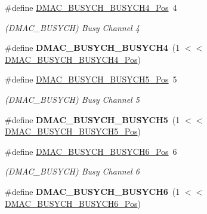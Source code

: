 \begin{DoxyCompactItemize}
\item 
\hypertarget{group___s_a_m_l21___d_m_a_c_ga21683f6b8e7523f9b7234438cac5e01f}{}\#define \hyperlink{group___s_a_m_l21___d_m_a_c_ga21683f6b8e7523f9b7234438cac5e01f}{D\+M\+A\+C\+\_\+\+B\+U\+S\+Y\+C\+H\+\_\+\+B\+U\+S\+Y\+C\+H4\+\_\+\+Pos}~4\label{group___s_a_m_l21___d_m_a_c_ga21683f6b8e7523f9b7234438cac5e01f}

\begin{DoxyCompactList}\small\item\em (D\+M\+A\+C\+\_\+\+B\+U\+S\+Y\+C\+H) Busy Channel 4 \end{DoxyCompactList}\item 
\hypertarget{group___s_a_m_l21___d_m_a_c_ga07547f972d8d68d60fc09ed0f28b826b}{}\#define {\bfseries D\+M\+A\+C\+\_\+\+B\+U\+S\+Y\+C\+H\+\_\+\+B\+U\+S\+Y\+C\+H4}~(1 $<$$<$ \hyperlink{group___s_a_m_l21___d_m_a_c_ga21683f6b8e7523f9b7234438cac5e01f}{D\+M\+A\+C\+\_\+\+B\+U\+S\+Y\+C\+H\+\_\+\+B\+U\+S\+Y\+C\+H4\+\_\+\+Pos})\label{group___s_a_m_l21___d_m_a_c_ga07547f972d8d68d60fc09ed0f28b826b}

\item 
\hypertarget{group___s_a_m_l21___d_m_a_c_ga1a406090b79f6b060ac17400735d2f13}{}\#define \hyperlink{group___s_a_m_l21___d_m_a_c_ga1a406090b79f6b060ac17400735d2f13}{D\+M\+A\+C\+\_\+\+B\+U\+S\+Y\+C\+H\+\_\+\+B\+U\+S\+Y\+C\+H5\+\_\+\+Pos}~5\label{group___s_a_m_l21___d_m_a_c_ga1a406090b79f6b060ac17400735d2f13}

\begin{DoxyCompactList}\small\item\em (D\+M\+A\+C\+\_\+\+B\+U\+S\+Y\+C\+H) Busy Channel 5 \end{DoxyCompactList}\item 
\hypertarget{group___s_a_m_l21___d_m_a_c_ga9e618b1f555e0c2e77afabcd2bfab02b}{}\#define {\bfseries D\+M\+A\+C\+\_\+\+B\+U\+S\+Y\+C\+H\+\_\+\+B\+U\+S\+Y\+C\+H5}~(1 $<$$<$ \hyperlink{group___s_a_m_l21___d_m_a_c_ga1a406090b79f6b060ac17400735d2f13}{D\+M\+A\+C\+\_\+\+B\+U\+S\+Y\+C\+H\+\_\+\+B\+U\+S\+Y\+C\+H5\+\_\+\+Pos})\label{group___s_a_m_l21___d_m_a_c_ga9e618b1f555e0c2e77afabcd2bfab02b}

\item 
\hypertarget{group___s_a_m_l21___d_m_a_c_ga88a78645158efa3e3019cbd15bde8e86}{}\#define \hyperlink{group___s_a_m_l21___d_m_a_c_ga88a78645158efa3e3019cbd15bde8e86}{D\+M\+A\+C\+\_\+\+B\+U\+S\+Y\+C\+H\+\_\+\+B\+U\+S\+Y\+C\+H6\+\_\+\+Pos}~6\label{group___s_a_m_l21___d_m_a_c_ga88a78645158efa3e3019cbd15bde8e86}

\begin{DoxyCompactList}\small\item\em (D\+M\+A\+C\+\_\+\+B\+U\+S\+Y\+C\+H) Busy Channel 6 \end{DoxyCompactList}\item 
\hypertarget{group___s_a_m_l21___d_m_a_c_gabfa269ea40731b0da1bb1cf04569f705}{}\#define {\bfseries D\+M\+A\+C\+\_\+\+B\+U\+S\+Y\+C\+H\+\_\+\+B\+U\+S\+Y\+C\+H6}~(1 $<$$<$ \hyperlink{group___s_a_m_l21___d_m_a_c_ga88a78645158efa3e3019cbd15bde8e86}{D\+M\+A\+C\+\_\+\+B\+U\+S\+Y\+C\+H\+\_\+\+B\+U\+S\+Y\+C\+H6\+\_\+\+Pos})\label{group___s_a_m_l21___d_m_a_c_gabfa269ea40731b0da1bb1cf04569f705}


\end{DoxyCompactItemize}
